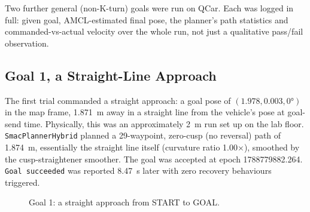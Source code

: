 Two further general (non-K-turn) goals were run on QCar.
Each was logged in full: given goal, AMCL-estimated
final pose, the planner's path statistics and commanded-vs-actual
velocity over the whole run, not just a qualitative pass/fail
observation.

\subsection{Goal 1, a Straight-Line Approach}
\label{sec:goal1-straight}

The first trial commanded a straight approach: a goal pose of
$(1.978, 0.003, \ang{0})$ in the map frame, \SI{1.871}{\meter} away in
a straight line from the vehicle's pose at goal-send time.
Physically, this was an approximately \SI{2}{\meter} run set up on
the lab floor. \texttt{SmacPlannerHybrid} planned a 29-waypoint, zero-cusp (no
reversal) path of \SI{1.874}{\meter}, essentially the straight line
itself (curvature ratio 1.00$\times$), smoothed by the
cusp-straightener smoother. The goal was accepted at epoch
1788779882.264. \texttt{Goal succeeded} was reported
\SI{8.47}{\second} later with zero recovery behaviours triggered.

\begin{figure}[htbp]
  \centering
  \caption[Goal 1 approach geometry]{Goal 1: a straight approach from START to GOAL.}
  \label{fig:goal1-geometry}
\end{figure}

